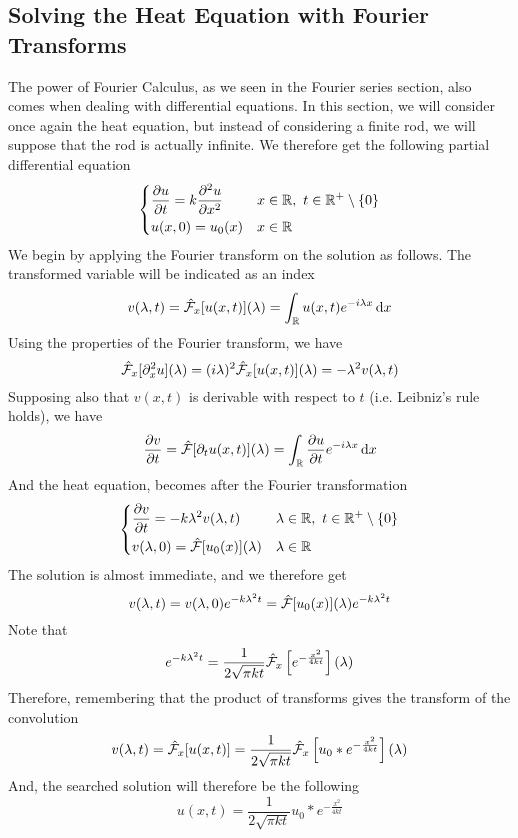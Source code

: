 \documentclass[../complete.tex]{subfiles}
\begin{document}
\subsection{Solving the Heat Equation with Fourier Transforms}
The power of Fourier Calculus, as we seen in the Fourier series section, also comes when dealing with differential equations. In this section, we will consider once again the heat equation, but instead of considering a finite rod, we will suppose that the rod is actually infinite. We therefore get the following partial differential equation
\begin{equation*}
	\begin{dcases}
		\pdv{u}{t}=k\pdv[2]{u}{x}&x\in\mathbb{R},\ t\in\mathbb{R}^+\setminus\{0\}\\
		u(x,0)=u_0(x)&x\in\mathbb{R}
	\end{dcases}
\end{equation*}
We begin by applying the Fourier transform on the solution as follows. The transformed variable will be indicated as an index
\begin{equation}
	v(\lambda,t)=\hat{\mathcal{F}}_x[u(x,t)](\lambda)=\int_{\mathbb{R}}^{}u(x,t)e^{-i\lambda x}\operatorname{d\!} x
	\label{eq:vlambdef}
\end{equation}
Using the properties of the Fourier transform, we have
\begin{equation*}
	\hat{\mathcal{F}}_x[\partial^2_xu](\lambda)=(i\lambda)^2\hat{\mathcal{F}}_x[u(x,t)](\lambda)=-\lambda^2v(\lambda,t)
\end{equation*}
Supposing also that $v(x,t)$ is derivable with respect to $t$ (i.e. Leibniz's rule holds), we have
\begin{equation*}
	\pdv{v}{t}=\hat{\mathcal{F}}[\partial_tu(x,t)](\lambda)=\int_{\mathbb{R}}^{}\pdv{u}{t}e^{-i\lambda x}\operatorname{d\!} x
\end{equation*}
And the heat equation, becomes after the Fourier transformation
\begin{equation}
	\begin{dcases}
		\pdv{v}{t}=-k\lambda^2v(\lambda,t)&\lambda\in\R,\ t\in\R^+\setminus\{0\}\\
		v(\lambda,0)=\fou[u_0(x)](\lambda)&\lambda\in\R
	\end{dcases}
	\label{eq:transformedheat}
\end{equation}
The solution is almost immediate, and we therefore get
\begin{equation*}
	v(\lambda,t)=v(\lambda,0)e^{-k\lambda^2t}=\hat{\mathcal{F}}[u_0(x)](\lambda)e^{-k\lambda^2t}
\end{equation*}
Note that
\begin{equation*}
	e^{-k\lambda^2t}=\frac{1}{2\sqrt{\pi kt}}\hat{\mathcal{F}}_x\left[ e^{-\frac{x^2}{4kt}} \right](\lambda)
\end{equation*}
Therefore, remembering that the product of transforms gives the transform of the convolution
\begin{equation*}
	v(\lambda,t)=\hat{\mathcal{F}}_x[u(x,t)]=\frac{1}{2\sqrt{\pi kt}}\hat{\mathcal{F}}_x\left[ u_0*e^{-\frac{x^2}{4kt}} \right](\lambda)
\end{equation*}
And, the searched solution will therefore be the following
\begin{equation*}
	u(x,t)=\frac{1}{2\sqrt{\pi kt}}u_0*e^{-\frac{x^2}{4kt}}
\end{equation*}
\end{document}
